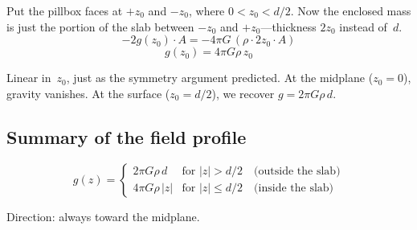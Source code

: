 \documentclass[11pt, letterpaper]{article}
\begin{document}
Put the pillbox faces at $+z_0$ and $-z_0$, where $0 < z_0 < d/2$. Now the enclosed mass is just the portion of the slab between $-z_0$ and $+z_0$---thickness $2z_0$ instead of~$d$.
\begin{equation}
  -2g(z_0)\cdot A = -4\pi G\,(\rho \cdot 2z_0 \cdot A)
\end{equation}
\begin{equation}
  g(z_0) = 4\pi G \rho\, z_0
\end{equation}

Linear in~$z_0$, just as the symmetry argument predicted. At the midplane ($z_0 = 0$), gravity vanishes. At the surface ($z_0 = d/2$), we recover $g = 2\pi G \rho\,d$.

\subsection{Summary of the field profile}

\begin{equation}
  \boxed{\;g(z) = \begin{cases} 2\pi G \rho\, d & \text{for } |z| > d/2 \quad \text{(outside the slab)} \\[8pt] 4\pi G \rho\, |z| & \text{for } |z| \leq d/2 \quad \text{(inside the slab)} \end{cases}\;}
  \label{eq:profile}
\end{equation}

\noindent Direction: always toward the midplane.

\end{document}
